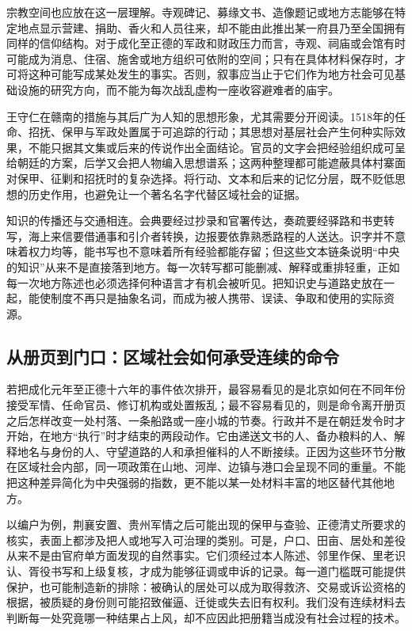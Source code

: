 宗教空间也应放在这一层理解。寺观碑记、募缘文书、造像题记或地方志能够在特定地点显示营建、捐助、香火和人员往来，却不能由此推出某一府县乃至全国拥有同样的信仰结构。对于成化至正德的军政和财政压力而言，寺观、祠庙或会馆有时可能成为消息、住宿、施舍或地方组织可依附的空间；只有在具体材料保存时，才可将这种可能写成某处发生的事实。否则，叙事应当止于它们作为地方社会可见基础设施的研究方向，而不能为每次战乱虚构一座收容避难者的庙宇。

王守仁在赣南的措施与其后广为人知的思想形象，尤其需要分开阅读。1518年的任命、招抚、保甲与军政处置属于可追踪的行动；其思想对基层社会产生何种实际效果，不能只据其文集或后来的传说作出全面结论。官员的文字会把经验组织成可呈给朝廷的方案，后学又会把人物编入思想谱系；这两种整理都可能遮蔽具体村寨面对保甲、征剿和招抚时的复杂选择。将行动、文本和后来的记忆分层，既不贬低思想的历史作用，也避免让一个著名名字代替区域社会的证据。

知识的传播还与交通相连。会典要经过抄录和官署传达，奏疏要经驿路和书吏转写，海上来信要借通事和引介者转换，边报要依靠熟悉路程的人送达。识字并不意味着权力均等，能书写也不意味着所有经验都能存留；但这些文本链条说明“中央的知识”从来不是直接落到地方。每一次转写都可能删减、解释或重排轻重，正如每一次地方陈述也必须选择何种语言才有机会被听见。把知识史与道路史放在一起，能使制度不再只是抽象名词，而成为被人携带、误读、争取和使用的实际资源。

\subsection{从册页到门口：区域社会如何承受连续的命令}

若把成化元年至正德十六年的事件依次排开，最容易看见的是北京如何在不同年份接受军情、任命官员、修订机构或处置叛乱；最不容易看见的，则是命令离开册页之后怎样改变一处村落、一条船路或一座小城的节奏。行政并不是在朝廷发令时才开始，在地方“执行”时才结束的两段动作。它由递送文书的人、备办粮料的人、解释地名与身份的人、守望道路的人和承担催科的人不断接续。正因为这些环节分散在区域社会内部，同一项政策在山地、河岸、边镇与港口会呈现不同的重量。不能把这种差异简化为中央强弱的指数，更不能以某一处材料丰富的地区替代其他地方。

以编户为例，荆襄安置、贵州军情之后可能出现的保甲与查验、正德清丈所要求的核实，表面上都涉及把人或地写入可治理的类别。可是，户口、田亩、居处和差役从来不是由官府单方面发现的自然事实。它们须经过本人陈述、邻里作保、里老识认、胥役书写和上级复核，才成为能够征调或申诉的记录。每一道门槛既可能提供保护，也可能制造新的排除：被确认的居处可以成为取得救济、交易或诉讼资格的根据，被质疑的身份则可能招致催逼、迁徙或失去旧有权利。我们没有连续材料去判断每一处究竟哪一种结果占上风，却不应因此把册籍当成没有社会过程的技术。

